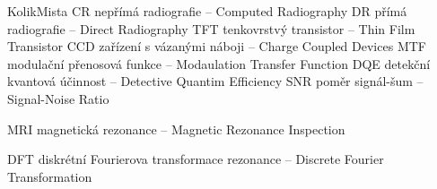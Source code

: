 \begin{seznamzkratek}{KolikMista}
			{CR}
			{nepřímá radiografie -- Computed Radiography}
			{DR}
			{přímá radiografie -- Direct Radiography}
			{TFT}
			{tenkovrstvý transistor -- Thin Film Transistor}
			{CCD}
			{zařízení s vázanými náboji -- Charge Coupled Devices}
			{MTF}
			{modulační přenosová funkce -- Modaulation Transfer Function}
			{DQE}
			{detekční kvantová účinnost -- Detective Quantim Efficiency}
			{SNR}
			{poměr signál-šum -- Signal-Noise Ratio}

			{MRI}
			{magnetická rezonance -- Magnetic Rezonance Inspection}
			
			{DFT}
			{diskrétní Fourierova transformace rezonance -- Discrete Fourier Transformation}
\end{seznamzkratek}
